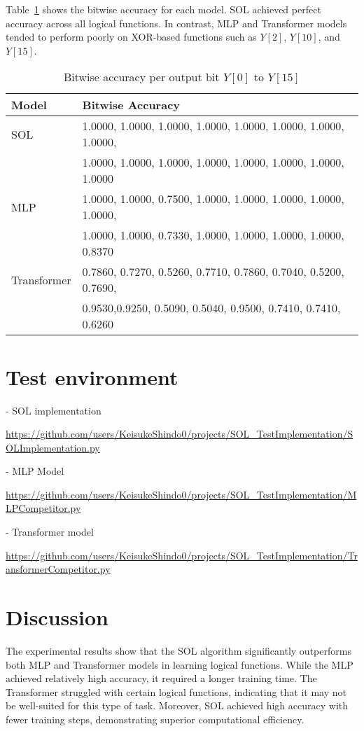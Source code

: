 \documentclass[11pt]{article}
\begin{document}
Table~\ref{fig:bitwise} shows the bitwise accuracy for each model. SOL achieved perfect accuracy across all logical functions. In contrast, MLP and Transformer models tended to perform poorly on XOR-based functions such as $Y[2]$, $Y[10]$, and $Y[15]$.

\begin{table}[H]
\centering
\caption{Bitwise accuracy per output bit $Y[0]$ to $Y[15]$}
\label{fig:bitwise}
\begin{tabular}{ll}
\toprule
\textbf{Model} & \textbf{Bitwise Accuracy} \\
\midrule
SOL & 1.0000, 1.0000, 1.0000, 1.0000, 1.0000, 1.0000, 1.0000, 1.0000, \\
    & 1.0000, 1.0000, 1.0000, 1.0000, 1.0000, 1.0000, 1.0000, 1.0000 \\
MLP & 1.0000, 1.0000, 0.7500, 1.0000, 1.0000, 1.0000, 1.0000, 1.0000, \\
    & 1.0000, 1.0000, 0.7330, 1.0000, 1.0000, 1.0000, 1.0000, 0.8370 \\
Transformer & 0.7860, 0.7270, 0.5260, 0.7710, 0.7860, 0.7040, 0.5200, 0.7690, \\
	& 0.9530,0.9250, 0.5090, 0.5040, 0.9500, 0.7410, 0.7410, 0.6260 \\
\bottomrule
\end{tabular}
\end{table}

\section{Test environment}

- SOL implementation 

\url{https://github.com/users/KeisukeShindo0/projects/SOL_TestImplementation/SOLImplementation.py}

- MLP Model  

\url{https://github.com/users/KeisukeShindo0/projects/SOL_TestImplementation/MLPCompetitor.py}

- Transformer model 
 
\url{https://github.com/users/KeisukeShindo0/projects/SOL_TestImplementation/TransformerCompetitor.py}

\section{Discussion}
The experimental results show that the SOL algorithm significantly outperforms both MLP and Transformer models in learning logical functions. While the MLP achieved relatively high accuracy, it required a longer training time. The Transformer struggled with certain logical functions, indicating that it may not be well-suited for this type of task. Moreover, SOL achieved high accuracy with fewer training steps, demonstrating superior computational efficiency.
\end{document}
